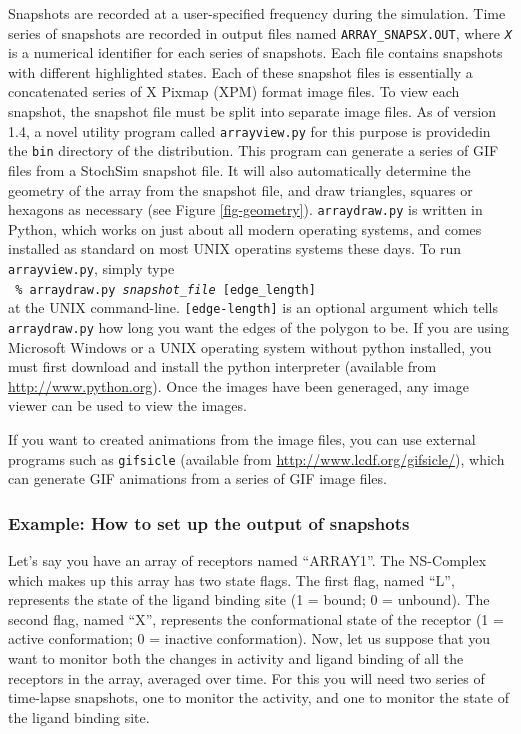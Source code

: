 Snapshots are recorded at a user-specified frequency during the
simulation.  Time series of snapshots are recorded in output files
named \texttt{ARRAY\_SNAPS\emph{X}.OUT}, where \texttt{\emph{X}} is a
numerical identifier for each series of snapshots.  Each file contains
snapshots with different highlighted states.  Each of these snapshot
files is essentially a concatenated series of X Pixmap (XPM) format
image files.  To view each snapshot, the snapshot file must be split
into separate image files.  As of version 1.4, a novel utility program
called \texttt{arrayview.py} for this purpose is providedin the
\texttt{bin} directory of the \stochsim{} distribution.  This program
can generate a series of GIF files from a StochSim snapshot file.  It
will also automatically determine the geometry of the array from the
snapshot file, and draw triangles, squares or hexagons as necessary
(see Figure \ref{fig-geometry}).  \texttt{arraydraw.py} is written in
Python, which works on just about all modern operating systems, and
comes installed as standard on most UNIX operatins systems these days.
To run \texttt{arrayview.py}, simply type
\\[\baselineskip]
\texttt{ \% arraydraw.py \emph{snapshot\_file} [edge\_length] }
\\[\baselineskip]
at the UNIX command-line. \texttt{[edge-length]} is an optional
argument which tells \texttt{arraydraw.py} how long you want the edges
of the polygon to be.  If you are using Microsoft Windows or a UNIX
operating system without python installed, you must first download and
install the python interpreter (available from
\url{http://www.python.org}).  Once the images have been generaged,
any image viewer can be used to view the images.

If you want to created animations from the image files, you can use
external programs such as \texttt{gifsicle} (available from
\url{http://www.lcdf.org/gifsicle/}), which can generate GIF
animations from a series of GIF image files.

\subsubsection{Example: How to set up the output of snapshots}
Let's say you have an array of receptors named ``ARRAY1''. The
NS-Complex which makes up this array has two state flags.  The first
flag, named ``L'', represents the state of the ligand binding site (1
= bound; 0 = unbound). The second flag, named ``X'', represents the
conformational state of the receptor (1 = active conformation; 0 =
inactive conformation).  Now, let us suppose that you want to monitor
both the changes in activity and ligand binding of all the receptors
in the array, averaged over time.  For this you will need two series
of time-lapse snapshots, one to monitor the activity, and one to
monitor the state of the ligand binding site.


